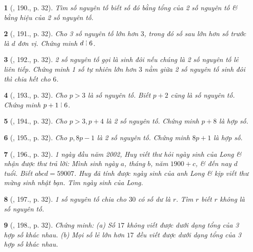 \documentclass{article}
\newtheorem{baitoan}{}
\DeclareRobustCommand{\divby}{%
	\mathrel{\vbox{\baselineskip.65ex\lineskiplimit0pt\hbox{.}\hbox{.}\hbox{.}}}%
}
\begin{document}
\begin{baitoan}[\cite{Binh_Toan_6_tap_1}, 190., p. 32]
	Tìm số nguyên tố biết số đó bằng tổng của 2 số nguyên tố \& bằng hiệu của 2 số nguyên tố.
\end{baitoan}

\begin{baitoan}[\cite{Binh_Toan_6_tap_1}, 191., p. 32]
	Cho 3 số nguyên tố lớn hơn $3$, trong đó số sau lớn hơn số trước là $d$ đơn vị. Chứng minh $d\divby6$.
\end{baitoan}

\begin{baitoan}[\cite{Binh_Toan_6_tap_1}, 192., p. 32]
	2 số nguyên tố gọi là {\rm sinh đôi} nếu chúng là 2 số nguyên tố lẻ liên tiếp. Chứng minh 1 số tự nhiên lớn hơn $3$ nằm giữa 2 số nguyên tố sinh đôi thì chia hết cho $6$.
\end{baitoan}

\begin{baitoan}[\cite{Binh_Toan_6_tap_1}, 193., p. 32]
	Cho $p > 3$ là số nguyên tố. Biết $p + 2$ cũng là số nguyên tố. Chứng minh $p + 1\divby6$.
\end{baitoan}

\begin{baitoan}[\cite{Binh_Toan_6_tap_1}, 194., p. 32]
	Cho $p > 3,p + 4$ là 2 số nguyên tố. Chứng minh $p + 8$ là hợp số.
\end{baitoan}

\begin{baitoan}[\cite{Binh_Toan_6_tap_1}, 195., p. 32]
	Cho $p,8p - 1$ là 2 số nguyên tố. Chứng minh $8p + 1$ là hợp số.
\end{baitoan}

\begin{baitoan}[\cite{Binh_Toan_6_tap_1}, 196., p. 32]
	1 ngày đầu năm 2002, Huy viết thư hỏi ngày sinh của Long \& nhận được thư trả lời: Mình sinh ngày $a$, tháng $b$, năm $1900 + c$, \& đến nay $d$ tuổi. Biết $abcd = 59007$. Huy đã tính được ngày sinh của anh Long \& kịp viết thư mừng sinh nhật bạn. Tìm ngày sinh của Long.
\end{baitoan}

\begin{baitoan}[\cite{Binh_Toan_6_tap_1}, 197., p. 32]
	1 số nguyên tố chia cho $30$ có số dư là $r$. Tìm $r$ biết $r$ không là số nguyên tố.
\end{baitoan}

\begin{baitoan}[\cite{Binh_Toan_6_tap_1}, 198., p. 32]
	Chứng minh: (a) Số $17$ không viết được dưới dạng tổng của 3 hợp số khác nhau. (b) Mọi số lẻ lớn hơn $17$ đều viết được dưới dạng tổng của 3 hợp số khác nhau.
\end{baitoan}
\end{document}
